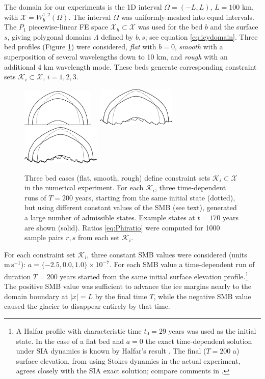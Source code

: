 \documentclass[hidelinks,onefignum,onetabnum,final]{siamart220329}  %
\newcommand{\cK}{\mathcal{K}}
\newcommand{\cX}{\mathcal{X}}
\begin{document}
The domain for our experiments is the 1D interval $\Omega=(-L,L)$, $L=100$ km, with $\cX = W_b^{1,2}(\Omega)$.  The interval $\Omega$ was uniformly-meshed into equal intervals.  The $P_1$ piecewise-linear FE space $\cX_h\subset \cX$ was used for the bed $b$ and the surface $s$, giving polygonal domains $\Lambda$ defined by $b,s$; see equation \eqref{eq:icydomain}.  Three bed profiles  (Figure \ref{fig:cases}) were considered, \emph{flat} with $b=0$, \emph{smooth} with a superposition of several wavelengths down to 10 km, and \emph{rough} with an additional 4 km wavelength mode.  These beds generate corresponding constraint sets $\cK_i \subset \cX$, $i=1,2,3$.

\begin{figure}[ht]
\mbox{\includegraphics[width=0.31\textwidth]{figs/snapsflat.png} \, \includegraphics[width=0.335\textwidth]{figs/snapssmooth.png} \, \includegraphics[width=0.335\textwidth]{figs/snapsrough.png}}

\caption{Three bed cases (flat, smooth, rough) define constraint sets $\cK_i\subset\cX$ in the numerical experiment.  For each $\cK_i$, three time-dependent runs of $T=200$ years, starting from the same initial state (dotted), but using different constant values of the SMB (see text), generated a large number of admissible states.  Example states at $t=170$ years are shown (solid).  Ratios \eqref{eq:Phiratio} were computed for 1000 sample pairs $r,s$ from each set $\cK_i$.}
\label{fig:cases}
\end{figure}

For each constraint set $\cK_i$, three constant SMB values were considered (units $\text{m}\,\text{s}^{-1}$): $a=\{-2.5,0.0,1.0\}\times 10^{-7}$.  For each SMB value a time-dependent run of duration $T=200$ years started from the same initial surface elevation profile.\footnote{A Halfar profile \cite{Halfar1981} with characteristic time $t_0=29$ years was used as the initial state.  In the case of a flat bed and $a=0$ the exact time-dependent solution under SIA dynamics is known by Halfar's result \cite{Halfar1981}.  The final ($T=200$ a) surface elevation, from using Stokes dynamics in the actual experiment, agrees closely with the SIA exact solution; compare comments in \cite{LofgrenAhlkronaHelanow2022}.}  The positive SMB value was sufficient to advance the ice margins nearly to the domain boundary at $|x|=L$ by the final time $T$, while the negative SMB value caused the glacier to disappear entirely by that time.
\end{document}
